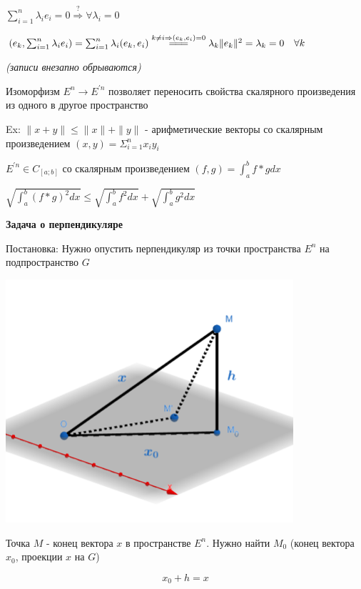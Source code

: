 \documentclass[12pt]{article}
\begin{document}
    $\sum_{i=1}^n \lambda_i e_i = 0 \stackrel{?}{\Longrightarrow} \forall \lambda_i = 0$

    $(e_k, \sum_{i=1}^n \lambda_i e_i) = \sum_{i=1}^n \lambda_i (e_k, e_i) \stackrel{k \neq i \Rightarrow (e_k, e_i) = 0}{=\joinrel=\joinrel=}
    \lambda_k \|e_k\|^2 = \lambda_k = 0 \quad \forall k$



    \textit{(записи внезапно обрываются)}



    \Nota Изоморфизм $E^n \rightarrow E^{\prime n}$ позволяет переносить свойства скалярного произведения
    из одного в другое пространство

    Ex: $\|x + y\| \leq \|x\| + \|y\|$ - арифметические векторы со скалярным произведением $(x, y) = \Sigma^n_{i=1} x_i y_i$

    $E^{\prime n} \in C_{[a;b]}$ со скалярным произведением $\displaystyle (f, g) = \int^b_a f * g dx$

    $\displaystyle \sqrt{\int^b_a (f * g)^2 dx} \leq \sqrt{\int^b_a f^2 dx} + \sqrt{\int^b_a g^2 dx}$

    \hypertarget{perpendicularproblem}{}

    \textbf{Задача о перпендикуляре}

    Постановка: Нужно опустить перпендикуляр из точки пространства $E^n$ на подпространство $G$

    \includegraphics[height=90mm]{specsec/images/specsec_2024_03_01_1}

    Точка $M$ - конец вектора $x$ в пространстве $E^n$.
    Нужно найти $M_0$ (конец вектора $x_0$, проекции $x$ на $G$)

    \[x_0 + h = x\]
\end{document}
